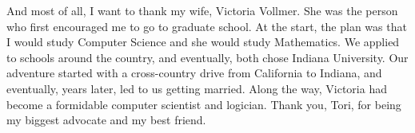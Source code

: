 \documentclass[showabstract,showacknowledgments,showpreface,showdedication]{iuphd}
\theoremstyle{nonumberplain}
\begin{document}
\begin{acknowledgments}
  And most of all, I want to thank my wife, Victoria Vollmer. She was the person
  who first encouraged me to go to graduate school. At the start, the plan was
  that I would study Computer Science and she would study Mathematics. We applied
  to schools around the country, and eventually, both chose Indiana University. Our
  adventure started with a cross-country drive from California to Indiana, and
  eventually, years later, led to us getting married. Along the way, Victoria had
  become a formidable computer scientist and logician. Thank you, Tori, for being
  my biggest advocate and my best friend.

\end{acknowledgments}





\end{document}
